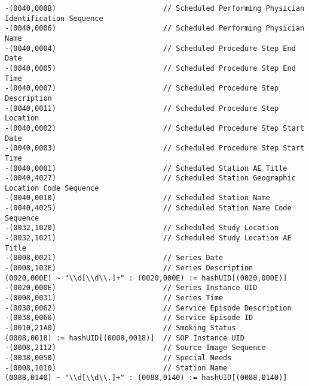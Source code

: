 \documentclass{beamer}  %
\begin{document}
\begin{frame}[fragile]
\tiny
\begin{verbatim}
-(0040,000B)                         // Scheduled Performing Physician Identification Sequence
-(0040,0006)                         // Scheduled Performing Physician Name
-(0040,0004)                         // Scheduled Procedure Step End Date
-(0040,0005)                         // Scheduled Procedure Step End Time
-(0040,0007)                         // Scheduled Procedure Step Description
-(0040,0011)                         // Scheduled Procedure Step Location
-(0040,0002)                         // Scheduled Procedure Step Start Date
-(0040,0003)                         // Scheduled Procedure Step Start Time
-(0040,0001)                         // Scheduled Station AE Title
-(0040,4027)                         // Scheduled Station Geographic Location Code Sequence
-(0040,0010)                         // Scheduled Station Name
-(0040,4025)                         // Scheduled Station Name Code Sequence
-(0032,1020)                         // Scheduled Study Location
-(0032,1021)                         // Scheduled Study Location AE Title
-(0008,0021)                         // Series Date
-(0008,103E)                         // Series Description
(0020,000E) ~ "\\d[\\d\\.]+" : (0020,000E) := hashUID[(0020,000E)]
-(0020,000E)                         // Series Instance UID
-(0008,0031)                         // Series Time
-(0038,0062)                         // Service Episode Description
-(0038,0060)                         // Service Episode ID
-(0010,21A0)                         // Smoking Status
(0008,0018) := hashUID[(0008,0018)]  // SOP Instance UID
-(0008,2112)                         // Source Image Sequence
-(0038,0050)                         // Special Needs
-(0008,1010)                         // Station Name
(0088,0140) ~ "\\d[\\d\\.]+" : (0088,0140) := hashUID[(0088,0140)]
\end{verbatim}
\end{frame}
\end{document}
